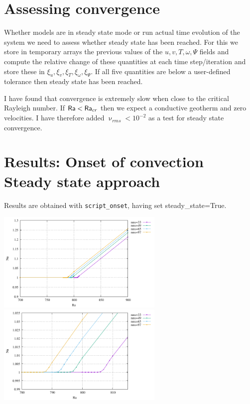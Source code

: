 \section*{Assessing convergence}

Whether models are in steady state mode or run actual time evolution of the system
we need to assess whether steady state has been reached. 
For this we store in temporary arrays the previous values of the $u,v,T,\omega,\Psi$ 
fields and compute the relative change of these quantities at each time step/iteration
and store these in $\xi_u,\xi_v,\xi_T,\xi_\omega,\xi_\Psi$. If all five quantities
are below a user-defined tolerance then steady state has been reached. 

I have found that convergence is extremely slow when close to the critical Rayleigh number. 
If ${\mathsf{Ra}}<{\mathsf{Ra}}_{cr}$ then we expect a conductive geotherm and zero velocities. 
I have therefore added $\upnu_{rms}<10^{-2}$ as a test for steady state convergence. 


\section*{Results: Onset of convection Steady state approach}

Results are obtained with {\tt script\_onset}, having set {\python steady\_state=True}.

\begin{center}
\includegraphics[width=8cm]{python_codes/fieldstone_155/results_onset/Ra_Nu.pdf}
\includegraphics[width=8cm]{python_codes/fieldstone_155/results_onset/Ra_Nu_zoom.pdf}
\end{center}

